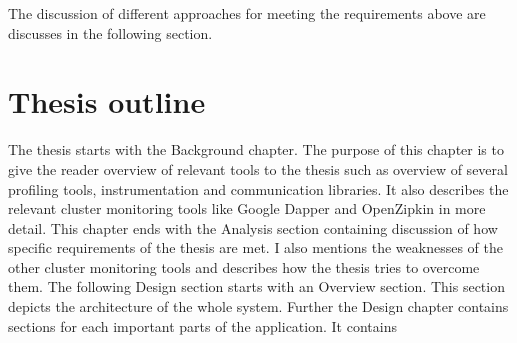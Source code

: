 The discussion of different approaches for meeting the requirements above are discusses in the following section.

\section{Thesis outline}
The thesis starts with the Background chapter. The purpose of this chapter is to give the reader overview of relevant tools to the thesis  such as overview of several profiling tools, instrumentation and communication libraries. It also describes the relevant cluster monitoring tools like Google Dapper and OpenZipkin in more detail. This chapter ends with the Analysis section containing discussion of how specific requirements of the thesis are met. I also mentions the weaknesses of the other cluster monitoring tools and describes how the thesis tries to overcome them. The following Design section starts with an Overview section. This section depicts the architecture of the whole system. Further the Design chapter contains sections for each important parts of the application. It contains 

